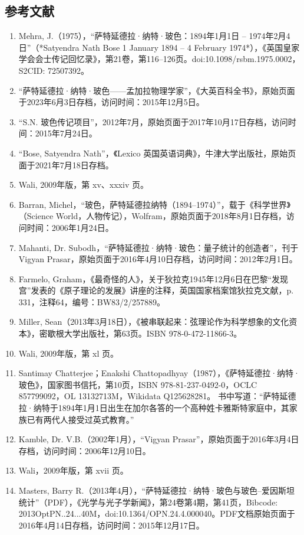 \subsection{参考文献}
\begin{enumerate}
\item Mehra, J.（1975），“萨特延德拉·纳特·玻色：1894年1月1日 – 1974年2月4日”（*Satyendra Nath Bose 1 January 1894 – 4 February 1974*），《英国皇家学会会士传记回忆录》，第21卷，第116–126页。doi:10.1098/rsbm.1975.0002，S2CID: 72507392。
\item “萨特延德拉·纳特·玻色——孟加拉物理学家”，《大英百科全书》，原始页面于2023年6月3日存档，访问时间：2015年12月5日。
\item “S.N. 玻色传记项目”，2012年7月，原始页面于2017年10月17日存档，访问时间：2015年7月24日。
\item “Bose, Satyendra Nath”，《Lexico 英国英语词典》，牛津大学出版社，原始页面于2021年7月18日存档。
\item Wali, 2009年版，第 xv、xxxiv 页。
\item Barran, Michel，“玻色，萨特延德拉纳特（1894–1974）”，载于《科学世界》（Science World，人物传记），Wolfram，原始页面于2018年8月1日存档，访问时间：2006年1月24日。
\item Mahanti, Dr. Subodh，“萨特延德拉·纳特·玻色：量子统计的创造者”，刊于 Vigyan Prasar，原始页面于2016年4月10日存档，访问时间：2012年2月1日。
\item Farmelo, Graham，《最奇怪的人》，关于狄拉克1945年12月6日在巴黎“发现宫”发表的《原子理论的发展》讲座的注释，英国国家档案馆狄拉克文献，p. 331，注释64，编号：BW83/2/257889。
\item Miller, Sean（2013年3月18日），《被串联起来：弦理论作为科学想象的文化资本》，密歇根大学出版社，第63页。ISBN 978-0-472-11866-3。
\item Wali, 2009年版，第 xl 页。
\item Santimay Chatterjee；Enakshi Chattopadhyay（1987），《萨特延德拉·纳特·玻色》，国家图书信托，第10页，ISBN 978-81-237-0492-0，OCLC 857799092，OL 13132713M，Wikidata Q125628281。
  书中写道：“萨特延德拉·纳特于1894年1月1日出生在加尔各答的一个高种姓卡雅斯特家庭中，其家族已有两代人接受过英式教育。”
\item Kamble, Dr. V.B.（2002年1月），“Vigyan Prasar”，原始页面于2016年3月4日存档，访问时间：2006年12月10日。
\item Wali，2009年版，第 xvii 页。
\item Masters, Barry R.（2013年4月），“萨特延德拉·纳特·玻色与玻色–爱因斯坦统计”（PDF），《光学与光子学新闻》，第24卷第4期，第41页，Bibcode: 2013OptPN..24...40M，doi:10.1364/OPN.24.4.000040。PDF文档原始页面于2016年4月14日存档，访问时间：2015年12月17日。

\end{enumerate}
